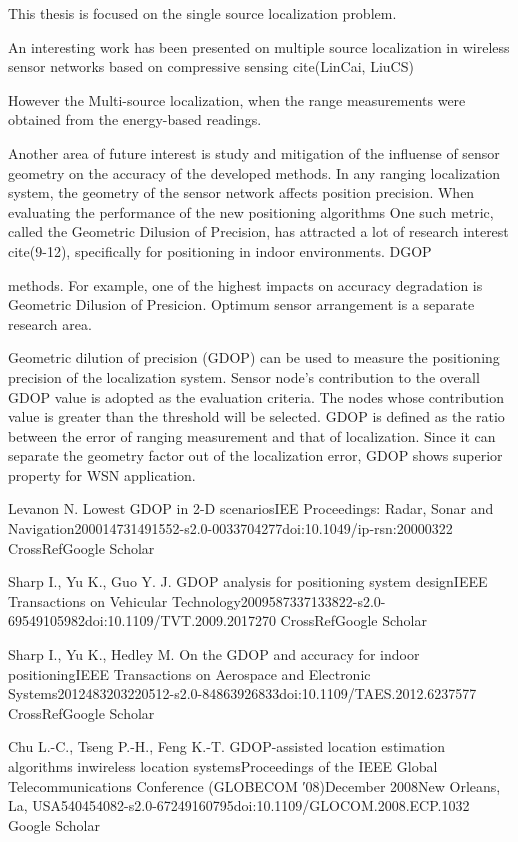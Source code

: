 This thesis is focused on the single source localization problem. 

An interesting work has been presented on multiple source localization in wireless sensor networks based on compressive sensing cite(LinCai, LiuCS)  

However the  
Multi-source localization, when the range measurements were obtained from the energy-based readings. 

Another area of future interest is study and mitigation of the influense of sensor geometry on the accuracy of the developed methods. In any ranging localization system, the geometry of the sensor network  affects position precision.  When evaluating the performance of the new positioning algorithms One such metric, called the Geometric Dilusion of Precision, has attracted a lot of research interest cite(9-12), specifically for positioning in indoor  environments. DGOP 

methods. For example, one of the highest impacts on accuracy degradation is Geometric Dilusion of Presicion. Optimum sensor arrangement is a separate research area. 

Geometric dilution of precision (GDOP) can be used to measure the positioning precision of the localization system. 
Sensor node's contribution to the overall GDOP value is adopted as the evaluation criteria. The nodes whose contribution value is greater than the threshold will be selected. 
GDOP is defined as the ratio between the error of ranging measurement and that of localization. Since it can separate the geometry factor out of the localization error, GDOP shows superior property for WSN application. 



    Levanon N.
Lowest GDOP in 2-D scenariosIEE Proceedings: Radar, Sonar and Navigation200014731491552-s2.0-0033704277doi:10.1049/ip-rsn:20000322
CrossRefGoogle Scholar


    Sharp I., Yu K., Guo Y. J.
GDOP analysis for positioning system designIEEE Transactions on Vehicular Technology2009587337133822-s2.0-69549105982doi:10.1109/TVT.2009.2017270
CrossRefGoogle Scholar


    Sharp I., Yu K., Hedley M.
On the GDOP and accuracy for indoor positioningIEEE Transactions on Aerospace and Electronic Systems2012483203220512-s2.0-84863926833doi:10.1109/TAES.2012.6237577
CrossRefGoogle Scholar


    Chu L.-C., Tseng P.-H., Feng K.-T.
GDOP-assisted location estimation algorithms inwireless location systemsProceedings of the IEEE Global Telecommunications Conference (GLOBECOM ′08)December 2008New Orleans, La, USA540454082-s2.0-67249160795doi:10.1109/GLOCOM.2008.ECP.1032
Google Scholar
